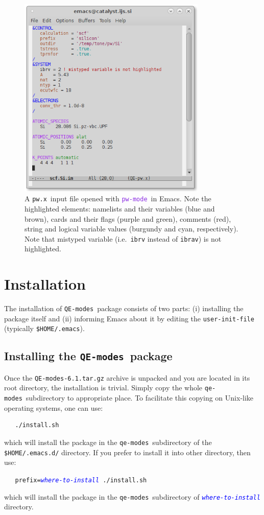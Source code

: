 \documentclass[12pt,a4paper]{article}
\def\version{6.1}
\def\pwx{\texttt{pw.x}}
\def\QEmodes{\texttt{QE-modes}}
\def\qemodes{\texttt{qe-modes}}
\def\efn#1{\textcolor{BlueViolet}{\texttt{#1}}}
\def\var#1{\textcolor{Blue}{\texttt{\textit{#1}}}}
\def\pwmode{\efn{pw-mode}}
\begin{document}
\begin{figure}[htb]
  \centering
  \includegraphics[width=0.8\textwidth]{highlight.png}
  \caption{A \pwx\ input file opened with \pwmode\ in Emacs. Note the
    highlighted elements: namelists and their variables (blue and
    brown), cards and their flags (purple and green), comments (red),
    string and logical variable values (burgundy and cyan,
    respectively). Note that mistyped variable (i.e.\ \texttt{ibrv}
    instead of \texttt{ibrav}) is not highlighted.}
  \label{fig:example}
\end{figure}
    
\section{Installation}

The installation of \QEmodes\ package consists of two parts: (i)
installing the package itself and (ii) informing Emacs about it by
editing the \verb+user-init-file+ (typically \verb+$HOME/.emacs+).

\subsection{Installing the \QEmodes\ package}
Once the \texttt{QE-modes-\version.tar.gz} archive is unpacked and you
are located in its root directory, the installation is trivial. Simply
copy the whole \qemodes\ subdirectory to appropriate place. To
facilitate this copying on Unix-like operating systems, one can use:
\begin{verbatim}
   ./install.sh
\end{verbatim}
which will install the package in the \qemodes\ subdirectory of the
\texttt{\$HOME/.emacs.d/} directory. If you prefer to install it into
other directory, then use:
\begin{flushleft}
\verb+   prefix=+\var{where-to-install}\verb+ ./install.sh+
\end{flushleft}
which will install the package in the \qemodes\ subdirectory of
\var{where-to-install} directory.
\end{document}

